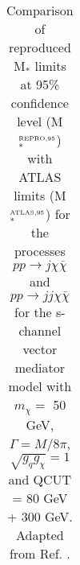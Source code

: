 \begin{flushleft}
\begin{table}[!htbp]
\begin{tabular}{c|c|c|c}
 \hline
 \hline
\end{tabular}
\caption{Comparison of reproduced M$_{*}$ limits at 95\% confidence level (M$_{*}^{\mbox{\tiny REPRO,95}}$) with ATLAS limits (M$_{*}^{\mbox{\tiny ATLAS,95}}$) for the processes $pp \rightarrow j\chi\bar{\chi}$ and $pp \rightarrow jj\chi\bar{\chi}$ for the s-channel vector mediator model with $m_{\chi} = $ 50 GeV, $\Gamma = M/8\pi$, $\sqrt{g_{q}g_{\chi}} = 1$ and QCUT = 80 GeV + 300 GeV. Adapted from Ref. \cite{Aad:2015zva}. }
\label{M_star_limits_monojet}
\end{table}
\end{flushleft}


